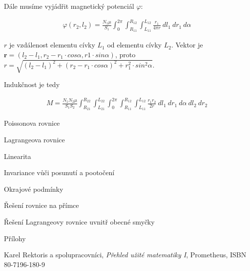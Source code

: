 \documentclass{book}
\newcommand{\vect}[1]{\boldsymbol{#1}}
\begin{document}
Dále musíme vyjádřit magnetický potenciál \(\varphi\):

\begin{equation}
\label{eq:civky_potencial}
\begin{split}
\varphi(r_2, l_2) = \frac{N_1 \mu}{S_1} \int_{0}^{2 \pi} \int_{R_{11}}^{R_{12}} \int_{L_{11}}^{L_{12}} \frac{r_1}{4 \pi r}  \ dl_1 \ dr_1 \ d \alpha
\end{split}
\end{equation}

\(r\) je vzdálenost elementu cívky \(L_1\) od elementu cívky \(L_2\). Vektor je \(\vect{r} = (l_2 - l_1, r_2 - r_1 \cdot cos \alpha, r1 \cdot sin \alpha)\), proto \(r = \sqrt{(l_2 - l_1)^2 + (r_2 - r_1 \cdot cos \alpha)^2 + r_1^2 \cdot sin^2 \alpha}\).

Indukčnost je tedy

\begin{equation}
\label{eq:indukcnost_1}
\begin{split}
M = \frac{N_1 N_2 \mu}{S_1 S_2} \int_{R_{21}}^{R_{22}} \int_{L_{21}}^{L_{22}} \int_{0}^{2 \pi} \int_{R_{11}}^{R_{12}} \int_{L_{11}}^{L_{12}} \frac{r_1 r_2}{2 r} \ dl_1 \ dr_1 \ d \alpha \ dl_2 \ dr_2
\end{split}
\end{equation}

Poissonova rovnice

Lagrangeova rovnice

Linearita

Invariance vůči posunutí a pootočení

Okrajové podmínky

Řešení rovnice na přímce

Řešení Lagrangeovy rovnice uvnitř obecné smyčky

Přílohy

\begin{thebibliography}{9}

Karel Rektoris a spolupracovníci,
\textit{Přehled užité matematiky I},
Prometheus,
ISBN 80-7196-180-9
\end{thebibliography}
\end{document}
